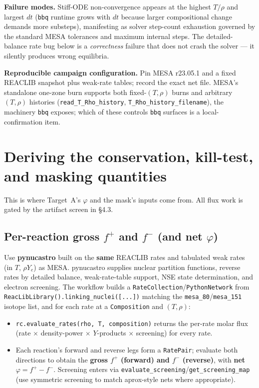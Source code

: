 \documentclass[11pt]{article}
\newcommand{\bbq}{\texttt{bbq}}
\begin{document}
\textbf{Failure modes.} Stiff-ODE non-convergence appears at the highest $T/\rho$ and largest $dt$ (\bbq{} runtime grows with $dt$ because larger compositional change demands more substeps), manifesting as solver step-count exhaustion governed by the standard MESA tolerances and maximum internal steps. The detailed-balance rate bug below is a \emph{correctness} failure that does not crash the solver --- it silently produces wrong equilibria.

\textbf{Reproducible campaign configuration.} Pin MESA r23.05.1 and a fixed REACLIB snapshot plus weak-rate tables; record the exact net file. MESA's standalone one-zone burn supports both fixed-$(T,\rho)$ burns and arbitrary $(T,\rho)$ histories (\texttt{read\_T\_Rho\_history}, \texttt{T\_Rho\_history\_filename}), the machinery \bbq{} exposes; which of these controls \bbq{} surfaces is a local-confirmation item.

\section{Deriving the conservation, kill-test, and masking quantities}

This is where Target~A's $\varphi$ and the mask's inputs come from. All flux work is gated by the artifact screen in \S4.3.

\subsection{Per-reaction gross \texorpdfstring{$f^+$}{f+} and \texorpdfstring{$f^-$}{f-} (and net \texorpdfstring{$\varphi$}{phi})}

Use \textbf{pynucastro} built on the \textbf{same} REACLIB rates and tabulated weak rates (in $T$, $\rho Y_e$) as MESA. pynucastro supplies nuclear partition functions, reverse rates by detailed balance, weak-rate-table support, NSE state determination, and electron screening. The workflow builds a \texttt{RateCollection}/\texttt{PythonNetwork} from \texttt{ReacLibLibrary().linking\_nuclei([...])} matching the \texttt{mesa\_80}/\texttt{mesa\_151} isotope list, and for each rate at a \texttt{Composition} and $(T, \rho)$:

\begin{itemize}
\item \texttt{rc.evaluate\_rates(rho, T, composition)} returns the per-rate molar flux (rate $\times$ density-power $\times$ $Y$-products $\times$ screening) for every rate.
\item Each reaction's forward and reverse legs form a \texttt{RatePair}; evaluate both directions to obtain the \textbf{gross $f^+$ (forward) and $f^-$ (reverse)}, with \textbf{net $\varphi = f^+ - f^-$}. Screening enters via \texttt{evaluate\_screening}/\texttt{get\_screening\_map} (use symmetric screening to match aprox-style nets where appropriate).
\end{itemize}
\end{document}
